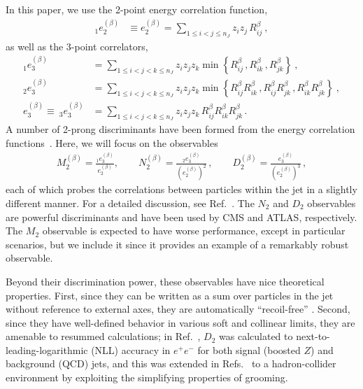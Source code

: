 \documentclass[11pt]{cernrep}
\begin{document}
In this paper, we use the 2-point energy correlation function,
\begin{align}\label{jetsub_2prong_eq:explicit_twopointvar}
_1e_2^{(\beta)}&\equiv e_2^{(\beta)}=\sum_{1\leq i<j\leq n_J} z_{i}z_{j} \, R_{ij}^\beta\ ,
\end{align}
as well as the 3-point correlators,
\begin{align}\label{jetsub_2prong_eq:explicit_ecfvar}
_1e_{3}^{(\beta)}&=\sum_{1\leq i<j<k\leq n_J} z_{i}z_{j}z_{k} \min \left\{ R_{ij}^\beta\,,  R_{ik}^\beta\,, R_{jk}^\beta  \right\} \ , \nonumber \\
_2e_{3}^{(\beta)}&=\sum_{1\leq i<j<k\leq n_J} z_{i}z_{j}z_{k} \min \left\{R_{ij}^\beta R_{ik}^\beta\,, R_{ij}^\beta  R_{jk}^\beta\,,     R_{ik}^\beta R_{jk}^\beta    \right\}  \ , \nonumber \\
e_{3}^{(\beta)}\equiv ~_3e_{3}^{(\beta)}&=\sum_{1\leq i<j<k\leq n_J} z_{i}z_{j}z_{k} \, R_{ij}^\beta R_{ik}^\beta R_{jk}^\beta \,.
\end{align}
%
A number of 2-prong discriminants have been formed from the energy correlation functions~\cite{Larkoski:2013eya,Larkoski:2014gra,Larkoski:2014zma,Moult:2016cvt}.  Here, we will focus on the observables
\begin{align}
 M_2^{(\beta)} = \frac{_1e_{3}^{(\beta)}}{e_{2}^{(\beta)}}, \qquad  N_2^{(\beta)} = \frac{_2e_{3}^{(\beta)}}{(e_{2}^{(\beta)})^2}\,, \qquad  D_{2}^{(\beta)}=\frac{e_{3}^{(\beta)}}{(e_{2}^{(\beta)})^{3}}\,, 
\end{align}
each of which probes the correlations between particles within the jet in a slightly different manner.
%
For a detailed discussion, see Ref.~\cite{Moult:2016cvt}.
%
The $N_2$ and $D_2$ observables are powerful discriminants and have
been used by CMS and ATLAS, respectively.
% 
%
The $M_2$ observable is expected to have worse performance, except in particular scenarios, but we include it since it provides an example of a remarkably robust observable.

Beyond their discrimination power, these observables have nice theoretical properties.
%
First, since they can be written as a sum over particles in the jet without reference to external axes, they are automatically ``recoil-free'' \cite{Catani:1992jc,Dokshitzer:1998kz,Banfi:2004yd,Larkoski:2013eya,Larkoski:2014uqa}.
%
Second, since they have well-defined behavior in various soft and collinear limits, they are amenable to resummed calculations;  in Ref.~\cite{Larkoski:2015kga}, $D_2$ was calculated to next-to-leading-logarithmic (NLL) accuracy in $e^+e^-$ for both signal (boosted $Z$) and background (QCD) jets, and this was extended in Refs.~\cite{Larkoski:2017iuy,Larkoski:2017cqq} to a hadron-collider environment by exploiting the simplifying properties of grooming.
\end{document}
